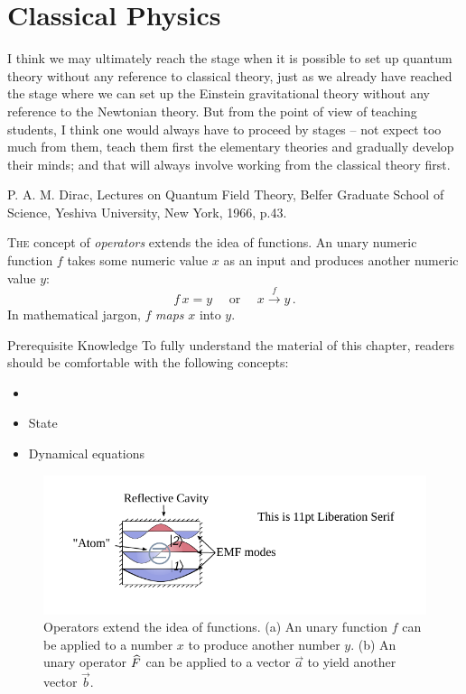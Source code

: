 \graphicspath{{../04ClassicalPhysics/pics/}}

\chapter{Classical Physics}\label{ch:ClassicalPhysics}
\begin{quoting}
	I think we may ultimately reach the stage when
	it is possible to set up quantum theory without any reference to classical theory,
	just as we already have reached the stage where we can set up the Einstein
	gravitational theory without any reference to the Newtonian theory. But
	from the point of view of teaching students, I think one would always
	have to proceed by stages -- not expect too much from them, teach them
	first the elementary theories and gradually develop their minds; and
	that will always involve working from the classical theory
	first.
	
	P. A. M. Dirac, Lectures on Quantum Field Theory, Belfer Graduate
	School of Science, Yeshiva University, New York, 1966, p.43.
\end{quoting}

\lettrine[lines=2]{\color{darkocre}T}{he} concept of
\emph{operators} extends the idea of functions. An unary numeric
function $f$ takes some numeric value $x$ as an input  and produces
another numeric value $y$:
\[
f\,x=y\quad \textrm{ or } \quad x\overset{f}{\longrightarrow} y\,.
\]
In mathematical jargon, $f$ \emph{maps} $x$ into $y$.

\begin{myprereq}{Prerequisite Knowledge}
	To fully understand the material of this chapter, readers should be comfortable with the following concepts:
	
	\begin{itemize}
		\item \phantom{phantom}
		\vspace{-0.5cm}
		\item State
		\item Dynamical equations
	\end{itemize}	
\end{myprereq}


\begin{figure}[htbp]
  \centering
  \includegraphics[scale=1.0]{defaultFigureTemplate}
  \caption{Operators extend the idea of functions. (a) An unary
    function $f$ can be applied to a number $x$ to produce
    another number $y$. (b) An unary operator $\widehat{F}$ can be applied to a vector
    $\vec{a}$ to yield another vector $\vec{b}$.}
  \label{fig:arrowsOperatorGeneral}
\end{figure}

